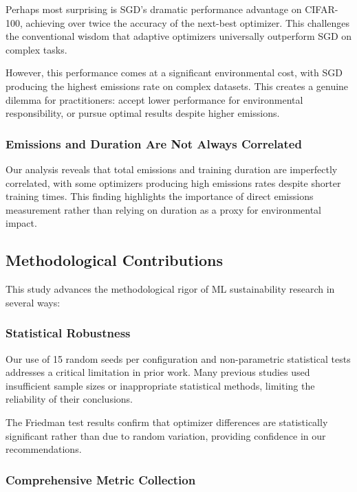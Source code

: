 \documentclass[conference]{IEEEtran}
\begin{document}
Perhaps most surprising is SGD's dramatic performance advantage on CIFAR-100, achieving over twice the accuracy of the next-best optimizer. This challenges the conventional wisdom that adaptive optimizers universally outperform SGD on complex tasks.

However, this performance comes at a significant environmental cost, with SGD producing the highest emissions rate on complex datasets. This creates a genuine dilemma for practitioners: accept lower performance for environmental responsibility, or pursue optimal results despite higher emissions.

\subsubsection{Emissions and Duration Are Not Always Correlated}

Our analysis reveals that total emissions and training duration are imperfectly correlated, with some optimizers producing high emissions rates despite shorter training times. This finding highlights the importance of direct emissions measurement rather than relying on duration as a proxy for environmental impact.

\subsection{Methodological Contributions}

This study advances the methodological rigor of ML sustainability research in several ways:

\subsubsection{Statistical Robustness}

Our use of 15 random seeds per configuration and non-parametric statistical tests addresses a critical limitation in prior work. Many previous studies used insufficient sample sizes or inappropriate statistical methods, limiting the reliability of their conclusions.

The Friedman test results confirm that optimizer differences are statistically significant rather than due to random variation, providing confidence in our recommendations.

\subsubsection{Comprehensive Metric Collection}
\end{document}

